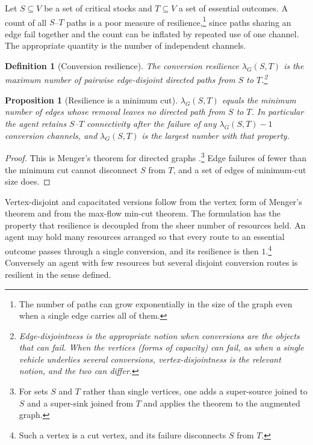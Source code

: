 \documentclass[11pt]{article}
\newtheorem{definition}{Definition}
\newtheorem{proposition}{Proposition}
\theoremstyle{remark}
\begin{document}
Let $S\subseteq V$ be a set of critical stocks and $T\subseteq V$ a set of essential outcomes. A count of all $S$--$T$ paths is a poor measure of resilience,\footnote{The number of paths can grow exponentially in the size of the graph even when a single edge carries all of them.} since paths sharing an edge fail together and the count can be inflated by repeated use of one channel. The appropriate quantity is the number of independent channels.

\begin{definition}[Conversion resilience]
The \emph{conversion resilience} $\lambda_G(S,T)$ is the maximum number of pairwise edge-disjoint directed paths from $S$ to $T$.\footnote{Edge-disjointness is the appropriate notion when conversions are the objects that can fail. When the vertices (forms of capacity) can fail, as when a single vehicle underlies several conversions, vertex-disjointness is the relevant notion, and the two can differ.}
\end{definition}

\begin{proposition}[Resilience is a minimum cut]
$\lambda_G(S,T)$ equals the minimum number of edges whose removal leaves no directed path from $S$ to $T$. In particular the agent retains $S$--$T$ connectivity after the failure of any $\lambda_G(S,T)-1$ conversion channels, and $\lambda_G(S,T)$ is the largest number with that property.
\end{proposition}

\begin{proof}
This is Menger's theorem for directed graphs \cite{menger,diestel}.\footnote{For sets $S$ and $T$ rather than single vertices, one adds a super-source joined to $S$ and a super-sink joined from $T$ and applies the theorem to the augmented graph.} Edge failures of fewer than the minimum cut cannot disconnect $S$ from $T$, and a set of edges of minimum-cut size does.
\end{proof}

Vertex-disjoint and capacitated versions follow from the vertex form of Menger's theorem and from the max-flow min-cut theorem. The formulation has the property that resilience is decoupled from the sheer number of resources held. An agent may hold many resources arranged so that every route to an essential outcome passes through a single conversion, and its resilience is then $1$.\footnote{Such a vertex is a cut vertex, and its failure disconnects $S$ from $T$.} Conversely an agent with few resources but several disjoint conversion routes is resilient in the sense defined.
\end{document}
